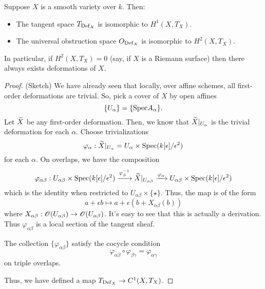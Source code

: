 \documentclass[11pt]{amsart}
\def\Spec{{\rm Spec}}
\begin{document}
\begin{thm}
Suppose $X$ is a smooth variety over $k$. 
Then:
\begin{itemize}
\item The tangent space $T_{{\rm Def}_X}$ is isomorphic to $H^1(X, T_X)$. 
\item The universal obstruction space $O_{{\rm Def}_X}$ is isomorphic to $H^2(X, T_X)$. 
\end{itemize}
In particular, if $H^2(X, T_X) = 0$ (say, if $X$ is a Riemann surface) then there always exists deformations of $X$. 
\end{thm}

\begin{proof} 
(Sketch)
We have already seen that locally, over affine schemes, all first-order deformations are trivial. 
So, pick a cover of $X$ by open affines
\[
\{U_\alpha\} = \{\Spec A_\alpha\} .
\] 
Let $\Tilde{X}$ be any first-order deformation.
Then, we know that $\Tilde{X}|_{U_\alpha}$ is the trivial deformation for each $\alpha$. 
Choose trivializations
\[
\varphi_\alpha : \Tilde{X}|_{U_\alpha} = U_\alpha \times \Spec(k[\epsilon]/\epsilon^2)
\]
for each $\alpha$.
On overlaps, we have the composition
\[
\varphi_{\alpha \beta} :  U_{\alpha\beta} \times \Spec(k[\epsilon]/\epsilon^2) \xto{\varphi_{\beta}^{-1}} \Tilde{X}|_{U_{\alpha\beta}} \xto{\varphi_\alpha} U_{\alpha\beta} \times \Spec(k[\epsilon]/\epsilon^2) 
\]
which is the identity when restricted to $U_{\alpha\beta} \times \{\star\}$.
Thus, the map is of the form
\[
a + \epsilon b \mapsto a + \epsilon(b + X_{\alpha\beta} (b))
\]
where $X_{\alpha \beta} : \sO(U_{\alpha\beta}) \to \sO(U_{\alpha\beta})$. 
It's easy to see that this is actually a derivation. 
Thus $\varphi_{\alpha\beta}$ is a local section of the tangent sheaf. 

The collection $\{\varphi_{\alpha \beta}\}$ satisfy the cocycle condition
\[
\varphi_{\alpha\beta} \circ \varphi_{\beta \gamma} = \varphi_{\alpha \gamma}
\]
on triple overlaps. 

Thus, we have defined a map $T_{\Def_X} \to {C}^1(X, T_X)$. 
\end{proof}
\end{document}
